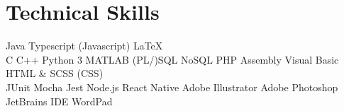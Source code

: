 \documentclass[]{deedy-resume-openfont}
\begin{document}
\section{Technical Skills}
Java \textbullet{} Typescript (Javascript) \textbullet{} \LaTeX\\ 
C \textbullet{} C++ \textbullet{} Python 3 \textbullet{} MATLAB \textbullet{} (PL/)SQL \textbullet{} NoSQL \textbullet{} PHP \textbullet{} Assembly \textbullet{} Visual Basic \textbullet{} HTML \& SCSS (CSS)\\
JUnit \textbullet{} Mocha \textbullet{} Jest \textbullet{} Node.js \textbullet{} React Native \textbullet{} Adobe Illustrator \textbullet{} Adobe Photoshop \textbullet{} JetBrains IDE \textbullet{} WordPad
\sectionsep
\end{document}

